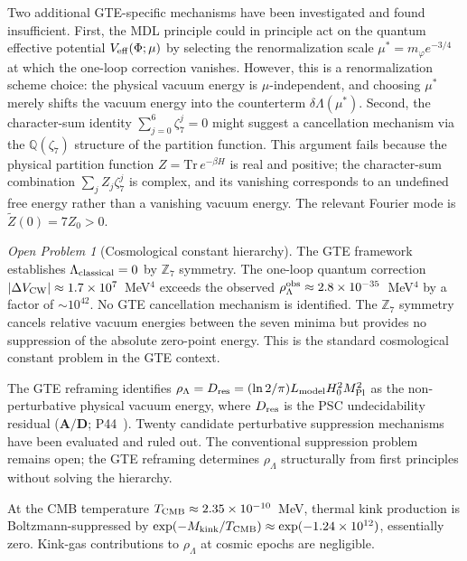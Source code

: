 \documentclass[11pt]{article}
\theoremstyle{remark}
\newtheorem{openprob}[theorem]{Open Problem}
\newcommand{\ZS}{\mathbb{Z}_7}
\newcommand{\Mkink}{M_{\rm kink}}
\newcommand{\CatAD}{\textbf{A/D}}
\newcommand{\rhoLam}{\rho_\Lambda}
\begin{document}
Two additional GTE-specific mechanisms have been investigated and found insufficient. First, the MDL principle could in principle act on the quantum effective potential $V_{\rm eff}(\Phi;\mu)$ by selecting the renormalization scale $\mu^* = m_\varphi e^{-3/4}$ at which the one-loop correction vanishes. However, this is a renormalization scheme choice: the physical vacuum energy is $\mu$-independent, and choosing $\mu^*$ merely shifts the vacuum energy into the counterterm $\delta\Lambda(\mu^*)$. Second, the character-sum identity $\sum_{j=0}^{6}\zeta_7^j = 0$ might suggest a cancellation mechanism via the $\mathbb{Q}(\zeta_7)$ structure of the partition function. This argument fails because the physical partition function $Z = \mathrm{Tr}\,e^{-\beta H}$ is real and positive; the character-sum combination $\sum_j Z_j \zeta_7^j$ is complex, and its vanishing corresponds to an undefined free energy rather than a vanishing vacuum energy. The relevant Fourier mode is $\tilde{Z}(0) = 7Z_0 > 0$.

\begin{openprob}[Cosmological constant hierarchy]
\label{op:cc}
The GTE framework establishes $\Lambda_{\rm classical} = 0$ by $\ZS$ symmetry.
The one-loop quantum correction $|\Delta V_{\rm CW}| \approx 1.7\times10^{7}$~MeV$^4$
exceeds the observed $\rhoLam^{\rm obs} \approx 2.8\times10^{-35}$~MeV$^4$ by a
factor of $\sim10^{42}$.
No GTE cancellation mechanism is identified.
The $\ZS$ symmetry cancels relative vacuum energies between the seven minima
but provides no suppression of the absolute zero-point energy.
This is the standard cosmological constant problem in the GTE context.
\end{openprob}

The GTE reframing identifies $\rho_\Lambda = D_{\rm res} = (\ln 2/\pi) L_{\rm model} H_0^2 M_{\rm Pl}^2$ as the non-perturbative physical vacuum energy, where $D_{\rm res}$ is the PSC undecidability residual ($\CatAD$; P44~\cite{SpivackQGR}). Twenty candidate perturbative suppression mechanisms have been evaluated and ruled out. The conventional suppression problem remains open; the GTE reframing determines $\rho_\Lambda$ structurally from first principles without solving the hierarchy.

At the CMB temperature $T_{\rm CMB} \approx 2.35\times10^{-10}$~MeV, thermal kink
production is Boltzmann-suppressed by $\exp(-\Mkink/T_{\rm CMB}) \approx
\exp(-1.24\times10^{12})$, essentially zero.
Kink-gas contributions to $\rhoLam$ at cosmic epochs are negligible.
\end{document}
